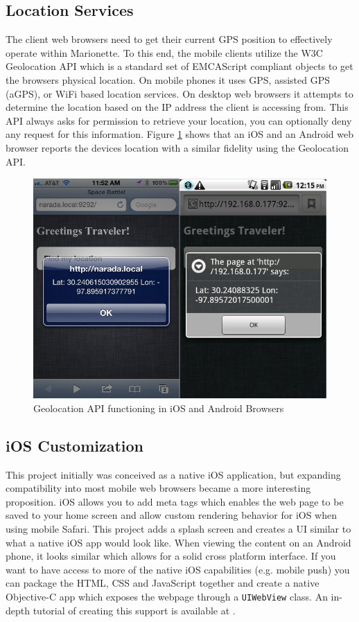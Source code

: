 \documentclass[12pt]{report}	%
\theoremstyle{definition}
\theoremstyle{remark}
\begin{document}
\subsection{Location Services}

The client web browsers need to get their current GPS position to
effectively operate within Marionette. To this end, the mobile clients
utilize the W3C Geolocation API which is a standard set of EMCAScript
compliant objects to get the browsers physical location. On mobile
phones it uses GPS, assisted GPS (aGPS), or WiFi based location
services. On desktop web browsers it attempts to determine the location
based on the IP address the client is accessing from. This API always
asks for permission to retrieve your location, you can optionally deny
any request for this information. Figure \ref{geoloc}
shows that an iOS and an Android web browser reports the devices
location with a similar fidelity using the Geolocation API.

\begin{figure}[h!]
\centering
\includegraphics[scale=0.6]{1.png}
\caption{Geolocation API functioning in iOS and Android Browsers}
\label{geoloc}
\end{figure}

\subsection{iOS Customization}

This project initially was conceived as a native iOS application, but
expanding compatibility into most mobile web browsers became a more
interesting proposition. iOS allows you to add meta tags which enables
the web page to be saved to your home screen and allow custom rendering
behavior for iOS when using mobile Safari. This project adds a splash
screen and creates a UI similar to what a native iOS app would look
like. When viewing the content on an Android phone, it looks similar
which allows for a solid cross platform interface. If you want to have
access to more of the native iOS capabilities (e.g. mobile push) you can
package the HTML, CSS and JavaScript together and create a native
Objective-C app which exposes the webpage through a
\texttt{UIWebView} class. An in-depth tutorial of
creating this support is available at \cite{mightios}.
\end{document}
